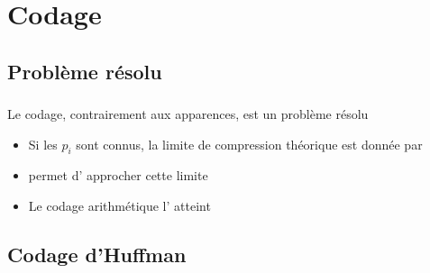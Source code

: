 \documentclass{beamer}
\newcommand{\relief}[1]{{\color{structureTextColor} #1}}
\theoremstyle{theoreme}
\begin{document}
\section{Codage}
\subsection{Problème résolu}

\begin{frame}
  \frametitle{\secname{}}
  \framesubtitle{\subsecname{}}
  Le codage, contrairement aux apparences, est un problème \relief{résolu}
  \begin{itemize}
    \item\pause Si les $p_i$ sont connus, la limite de compression théorique est donnée par 
    \item\pause {} permet d'\relief{approcher} cette limite
    \item\pause Le codage arithmétique l'\relief{atteint}
  \end{itemize}
\end{frame}

\subsection{Codage d'Huffman}
\end{document}
